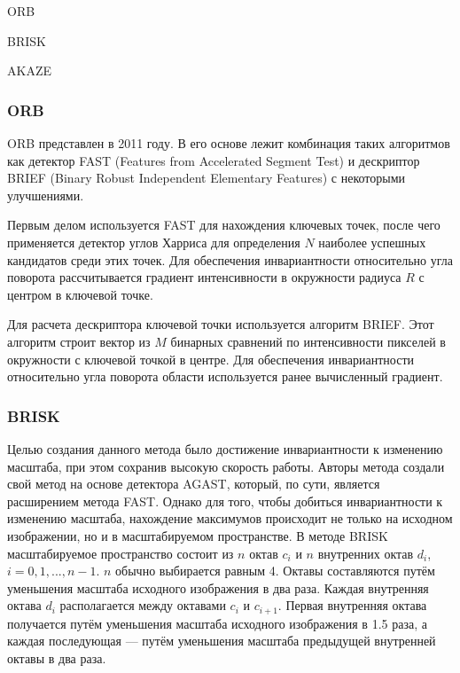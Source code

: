 %
\begin{itemize*}
  \item ORB
  \item BRISK
  \item AKAZE
\end{itemize*}
%

\subsubsection{ORB}

ORB представлен в 2011 году\cite{twentytwo}. В его основе лежит комбинация таких алгоритмов как детектор FAST (Features from Accelerated Segment Test) и дескриптор BRIEF (Binary Robust Independent Elementary Features) с некоторыми улучшениями. 

Первым делом используется FAST для нахождения ключевых точек, после чего применяется детектор углов Харриса для определения \(N\) наиболее успешных кандидатов среди этих точек. Для обеспечения инвариантности относительно угла поворота рассчитывается градиент интенсивности в окружности радиуса \(R\) с центром в ключевой точке.

Для расчета дескриптора ключевой точки используется алгоритм BRIEF. Этот алгоритм строит вектор из \(M\) бинарных сравнений по интенсивности пикселей в окружности с ключевой точкой в центре. Для обеспечения инвариантности относительно угла поворота области используется ранее вычисленный градиент.

\subsubsection{BRISK}

Целью создания данного метода было достижение инвариантности к изменению масштаба, при этом сохранив высокую скорость работы. Авторы метода создали свой метод на основе детектора AGAST, который, по сути, является расширением метода FAST\cite{twentytwo}. Однако для того, чтобы добиться инвариантности к изменению масштаба, нахождение максимумов происходит не только на исходном изображении, но и в масштабируемом пространстве. В методе BRISK масштабируемое пространство состоит из \(n\) октав \(c_i\) и \(n\) внутренних октав \(d_i\), \(i = {0, 1, ..., n-1}\). \(n\) обычно выбирается равным 4. Октавы составляются путём уменьшения масштаба исходного изображения в два раза. Каждая внутренняя октава \(d_i\) располагается между октавами \(c_i\) и \(c_{i+1}\). Первая внутренняя октава получается путём уменьшения масштаба исходного изображения в 1.5 раза, а каждая последующая — путём уменьшения масштаба предыдущей внутренней октавы в два раза.

